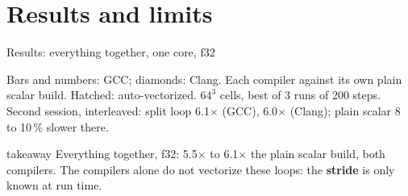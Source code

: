 \documentclass[aspectratio=169,10pt,t]{beamer}
\newcommand{\sx}[1]{#1\ensuremath{\times}} %
\newcommand{\term}[1]{\textcolor{psblue!85!black}{\textbf{#1}}} %
\newcommand{\takeaway}[1]{\par\vfill
  \begin{beamercolorbox}[wd=\textwidth,sep=4pt,rounded=true]{takeaway}
    \small #1
  \end{beamercolorbox}}
\begin{document}
\section{Results and limits}

\begin{frame}{Results: everything together, one core, f32}
  \vspace{1mm}
  \centering

  \vspace{0.5mm}
  {\scriptsize\color{psgray}Bars and numbers: GCC; diamonds: Clang. Each compiler against its own plain
  scalar build. Hatched: auto-vectorized. $64^3$ cells, best of 3 runs of 200 steps. Second session,
  interleaved: split loop \sx{6.1} (GCC), \sx{6.0} (Clang); plain scalar 8 to 10\,\% slower there.\par}
  \takeaway{Everything together, f32: \sx{5.5} to \sx{6.1} the plain scalar build, both compilers. The
    compilers alone do not vectorize these loops: the \term{stride} is only known at run time.}
\end{frame}
\end{document}
